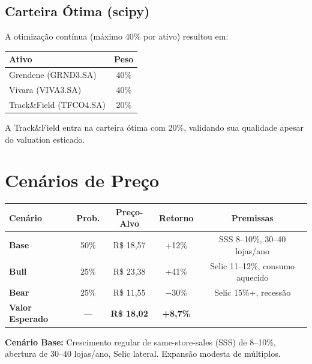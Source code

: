 \documentclass[12pt, a4paper]{article}
\begin{document}
\subsection{Carteira Ótima (scipy)}

A otimização contínua (máximo 40\% por ativo) resultou em:

\begin{center}
\begin{tabular}{lc}
\toprule
\textbf{Ativo} & \textbf{Peso} \\
\midrule
Grendene (GRND3.SA) & 40\% \\
Vivara (VIVA3.SA) & 40\% \\
Track\&Field (TFCO4.SA) & 20\% \\
\bottomrule
\end{tabular}
\end{center}

A Track\&Field entra na carteira ótima com 20\%, validando sua qualidade apesar do valuation esticado.

\section{Cenários de Preço}

\begin{center}
\begin{tabular}{lcccc}
\toprule
\textbf{Cenário} & \textbf{Prob.} & \textbf{Preço-Alvo} & \textbf{Retorno} & \textbf{Premissas} \\
\midrule
\rowcolor{cinzatabela}
\textbf{Base} & 50\% & R\$ 18,57 & +12\% & SSS 8--10\%, 30--40 lojas/ano \\
\textcolor{verdepositivo}{\textbf{Bull}} & 25\% & R\$ 23,38 & +41\% & Selic 11--12\%, consumo aquecido \\
\rowcolor{cinzatabela}
\textcolor{vermelhoneg}{\textbf{Bear}} & 25\% & R\$ 11,55 & $-30\%$ & Selic 15\%+, recessão \\
\midrule
\textbf{Valor Esperado} & --- & \textbf{R\$ 18,02} & \textbf{+8,7\%} & \\
\bottomrule
\end{tabular}
\end{center}

\textbf{Cenário Base:} Crescimento regular de same-store-sales (SSS) de 8--10\%, abertura de 30--40 lojas/ano, Selic lateral. Expansão modesta de múltiplos.
\end{document}
